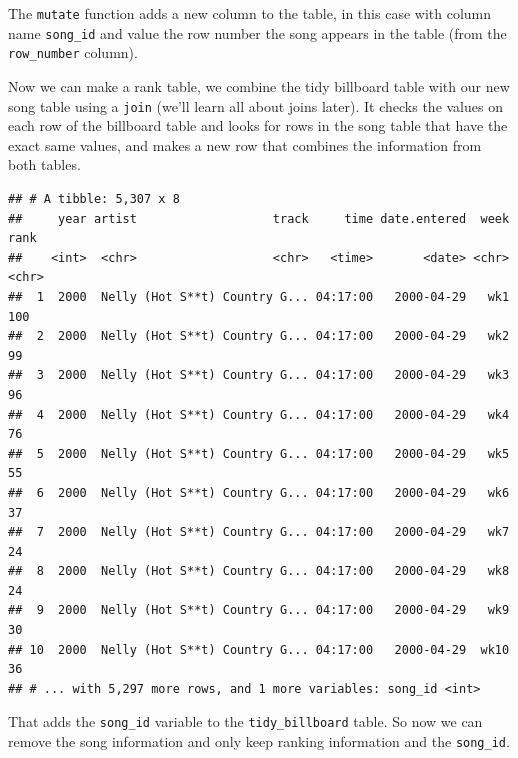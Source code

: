 \documentclass[]{article}
\newenvironment{Shaded}{\begin{snugshade}}{\end{snugshade}}
\newcommand{\KeywordTok}[1]{\textcolor[rgb]{0.13,0.29,0.53}{\textbf{{#1}}}}
\newcommand{\StringTok}[1]{\textcolor[rgb]{0.31,0.60,0.02}{{#1}}}
\newcommand{\NormalTok}[1]{{#1}}
\theoremstyle{definition}
\theoremstyle{definition}
\theoremstyle{remark}
\begin{document}
The \texttt{mutate} function adds a new column to the table, in this
case with column name \texttt{song\_id} and value the row number the
song appears in the table (from the \texttt{row\_number} column).

Now we can make a rank table, we combine the tidy billboard table with
our new song table using a \texttt{join} (we'll learn all about joins
later). It checks the values on each row of the billboard table and
looks for rows in the song table that have the exact same values, and
makes a new row that combines the information from both tables.

\begin{Shaded}
\end{Shaded}

\begin{verbatim}
## # A tibble: 5,307 x 8
##     year artist                   track     time date.entered  week  rank
##    <int>  <chr>                   <chr>   <time>       <date> <chr> <chr>
##  1  2000  Nelly (Hot S**t) Country G... 04:17:00   2000-04-29   wk1   100
##  2  2000  Nelly (Hot S**t) Country G... 04:17:00   2000-04-29   wk2    99
##  3  2000  Nelly (Hot S**t) Country G... 04:17:00   2000-04-29   wk3    96
##  4  2000  Nelly (Hot S**t) Country G... 04:17:00   2000-04-29   wk4    76
##  5  2000  Nelly (Hot S**t) Country G... 04:17:00   2000-04-29   wk5    55
##  6  2000  Nelly (Hot S**t) Country G... 04:17:00   2000-04-29   wk6    37
##  7  2000  Nelly (Hot S**t) Country G... 04:17:00   2000-04-29   wk7    24
##  8  2000  Nelly (Hot S**t) Country G... 04:17:00   2000-04-29   wk8    24
##  9  2000  Nelly (Hot S**t) Country G... 04:17:00   2000-04-29   wk9    30
## 10  2000  Nelly (Hot S**t) Country G... 04:17:00   2000-04-29  wk10    36
## # ... with 5,297 more rows, and 1 more variables: song_id <int>
\end{verbatim}

That adds the \texttt{song\_id} variable to the \texttt{tidy\_billboard}
table. So now we can remove the song information and only keep ranking
information and the \texttt{song\_id}.

\begin{Shaded}
\end{Shaded}
\end{document}
